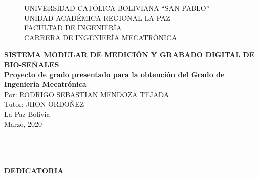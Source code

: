 \begin{center}
\begin{figure}
\centering%
\textsc{\large UNIVERSIDAD CAT\'OLICA BOLIVIANA ``SAN PABLO'' }\\[0.3cm] %
\textsc{\large UNIDAD ACAD\'EMICA REGIONAL LA PAZ}\\[0.3cm] %
\textsc{\large FACULTAD DE INGENIER\'IA}\\[0.3cm]
\textsc{\normalsize  CARRERA DE INGENIER\'IA MECATR\'ONICA}\\[0.1cm]
%
\end{figure}
\textbf{\large SISTEMA MODULAR DE MEDICI\'ON Y GRABADO DIGITAL DE BIO-SE\~NALES}\\[0.5cm]

\thispagestyle{empty} \vspace*{0.01cm} \textbf{\large Proyecto de grado presentado para la obtenci\'on del Grado de Ingenier\'ia Mecatr\'onica}\\[0.65cm]

\thispagestyle{empty} \vspace*{0.01cm} \normalsize Por: RODRIGO SEBASTIAN
MENDOZA TEJADA \\[0.8cm]

\thispagestyle{empty} \vspace*{0.01cm} \normalsize Tutor: JHON ORDO\~NEZ\\[1.5cm]

\vspace*{0.01cm} \normalsize La Paz-Bolivia\\[0.25cm]
\vspace*{0.01cm} \normalsize Marzo, 2020
\end{center}

\newpage{\pagestyle{empty}\cleardoublepage}

\newpage

\newpage{\pagestyle{empty}\cleardoublepage}

\newpage
\thispagestyle{empty} \textbf{}\normalsize
\\\\\\%
\textbf{DEDICATORIA}\\[4.0cm]

